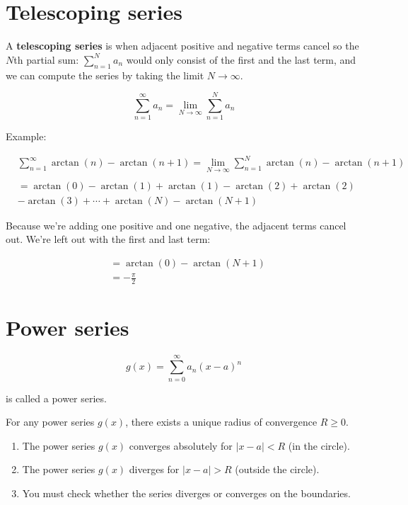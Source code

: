 \documentclass[12pt]{article}
\theoremstyle{plain}
\theoremstyle{remark}
\theoremstyle{definition}
\begin{document}
\section{Telescoping series}

A \textbf{telescoping series} is when adjacent positive and negative
terms cancel so the \(N\)th partial sum: \(\sum_{n = 1}^{N}a_{n}\) would
only consist of the first and the last term, and we can compute the
series by taking the limit \(N \rightarrow \infty\).

\[\sum_{n = 1}^{\infty}a_{n} = \lim_{N \rightarrow \infty}{\sum_{n = 1}^{N}a_{n}}\]

Example:

\begin{align*}
&\sum_{n = 1}^{\infty}{\arctan(n) - \arctan(n + 1)} = \lim_{N \rightarrow \infty}{\sum_{n = 1}^{N}{\arctan(n) - \arctan(n + 1)}} \\
& \\
&= \arctan(0) - \arctan(1) + \arctan(1) - \arctan(2) + \arctan(2)  \\
&- \arctan(3) + \cdots + \arctan(N) - \arctan(N + 1)
\end{align*}


Because we're adding one positive and one negative, the adjacent terms
cancel out. We're left out with the first and last term:

\begin{align*}
&= \arctan(0) - \arctan(N + 1) \\
&= - \frac{\pi}{2}
\end{align*}



\section{Power series}

\[g(x) = \sum_{n = 0}^{\infty}{a_{n}(x - a)^{n}}\]

is called a power series.

For any power series \(g(x)\), there exists a unique radius of
convergence \(R \geq 0\).

\begin{enumerate}
\def\labelenumi{\arabic{enumi}.}
\item
  The power series \(g(x)\) converges absolutely for \(|x - a| < R\) (in
  the circle).
\item
  The power series \(g(x)\) diverges for \(|x - a| > R\) (outside the
  circle).
\item
  You must check whether the series diverges or converges on the
  boundaries.
\end{enumerate}
\end{document}
